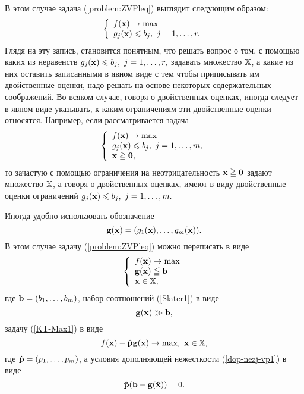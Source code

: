    В этом случае задача (\ref{problem:ZVPleq}) выглядит следующим
    образом:
\begin{equation*}
    \left\{ \begin{array}{l}
         f(\mathbf{x}) \to \max  \\
        g_j (\mathbf{x}) \leqslant b_j, \ j = 1,\ldots,r.\\
          \end{array} \right.
\end{equation*}
    Глядя на эту запись, становится понятным, что решать вопрос о том, с
    помощью каких из неравенств
    $g_j (\mathbf{x}) \leqslant b_j, \ j = 1,\ldots,r,$
    задавать множество $\mathbb{X}$, а какие из них оставить
    записанными в явном виде с
    тем чтобы приписывать им двойственные оценки,
    надо решать на основе некоторых содержательных соображений. Во
    всяком случае, говоря о двойственных оценках,  иногда следует в явном
    виде указывать, к каким ограничениям эти двойственные оценки
    относятся. Например, если рассматривается задача
\begin{equation*}
    \left\{
    \begin{array}{l}
         f(\mathbf{x}) \to \max  \\
        g_j (\mathbf{x}) \leqslant b_j, \ j = 1,\ldots,m,\\
    \mathbf{x}\geqq\mathbf{0},
    \end{array} \right.
\end{equation*}
    то зачастую с помощью ограничения на неотрицательность
    $\mathbf{x}\geqq\mathbf{0}$ задают множество $\mathbb{X}$, а говоря о
    двойственных оценках, имеют в виду двойственные оценки
    ограничений   $g_j (\mathbf{x}) \leqslant b_j, \ j = 1,\ldots,m.$




    Иногда удобно использовать обозначение
\[
    \mathbf{g}(\mathbf{x})=(g_{1}(\mathbf{x}),\ldots,g_{m}(\mathbf{x})).
\]
    В этом случае задачу (\ref{problem:ZVPleq}) можно переписать в
    виде
\begin{equation}\label{problem:ZVPleq-vec}
    \left\{ \begin{array}{l}
         f(\mathbf{x}) \to \max  \\
        \mathbf{g}(\mathbf{x})\leqq \mathbf{b}\\
        \mathbf{x} \in \mathbb{X}, \\
  \end{array} \right.
\end{equation}
    где $\mathbf{b}=(b_{1},\ldots,b_{m})$, набор соотношений (\ref{Slater1}) в виде
\[
    \mathbf{g}(\mathbf{x})\gg \mathbf{b},
\]
    задачу (\ref{KT-Max1}) в виде
\begin{equation}\label{KT-Max1-vec}
    f(\mathbf{x})-\mathbf{\hat{p}}\mathbf{g}(\mathbf{x})\rightarrow\max, \
    \mathbf{x}\in\mathbb{X},
\end{equation}
    где $\mathbf{\hat{p}}=(p_{1},\ldots,p_{m})$,
    а условия дополняющей нежесткости (\ref{dop-nezj-vp1}) в виде
\begin{equation}\label{dop-nezj-vp1-vec}
    \mathbf{\hat{p}}(\mathbf{b}-\mathbf{g}(\mathbf{\hat{x}}))=0.
\end{equation}



